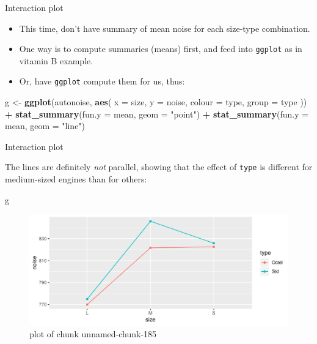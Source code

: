 \documentclass[ignorenonframetext,]{beamer}
\newenvironment{Shaded}{\begin{snugshade}}{\end{snugshade}}
\newcommand{\DataTypeTok}[1]{\textcolor[rgb]{0.13,0.29,0.53}{#1}}
\newcommand{\KeywordTok}[1]{\textcolor[rgb]{0.13,0.29,0.53}{\textbf{#1}}}
\newcommand{\NormalTok}[1]{#1}
\newcommand{\OperatorTok}[1]{\textcolor[rgb]{0.81,0.36,0.00}{\textbf{#1}}}
\newcommand{\StringTok}[1]{\textcolor[rgb]{0.31,0.60,0.02}{#1}}
\begin{document}
\begin{frame}[fragile]{Interaction plot}
\protect\hypertarget{interaction-plot-1}{}

\begin{itemize}
\item
  This time, don't have summary of mean noise for each size-type
  combination.
\item
  One way is to compute summaries (means) first, and feed into
  \texttt{ggplot} as in vitamin B example.
\item
  Or, have \texttt{ggplot} compute them for us, thus:
\end{itemize}

\begin{Shaded}
\begin{Highlighting}[]
\NormalTok{g <-}\StringTok{ }\KeywordTok{ggplot}\NormalTok{(autonoise, }\KeywordTok{aes}\NormalTok{(}
  \DataTypeTok{x =}\NormalTok{ size, }\DataTypeTok{y =}\NormalTok{ noise,}
  \DataTypeTok{colour =}\NormalTok{ type, }\DataTypeTok{group =}\NormalTok{ type}
\NormalTok{)) }\OperatorTok{+}
\StringTok{  }\KeywordTok{stat_summary}\NormalTok{(}\DataTypeTok{fun.y =}\NormalTok{ mean, }\DataTypeTok{geom =} \StringTok{"point"}\NormalTok{) }\OperatorTok{+}
\StringTok{  }\KeywordTok{stat_summary}\NormalTok{(}\DataTypeTok{fun.y =}\NormalTok{ mean, }\DataTypeTok{geom =} \StringTok{"line"}\NormalTok{)}
\end{Highlighting}
\end{Shaded}

\end{frame}

\begin{frame}[fragile]{Interaction plot}
\protect\hypertarget{interaction-plot-2}{}

The lines are definitely \emph{not} parallel, showing that the effect of
\texttt{type} is different for medium-sized engines than for others:

\begin{Shaded}
\begin{Highlighting}[]
\NormalTok{g}
\end{Highlighting}
\end{Shaded}

\begin{figure}
\centering
\includegraphics{figure/unnamed-chunk-185-1.pdf}
\caption{plot of chunk unnamed-chunk-185}
\end{figure}

\end{frame}
\end{document}

